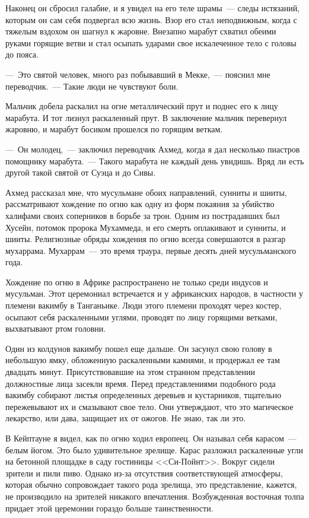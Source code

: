 \documentclass[12pt,a4paper,twoside,openany,svgnames]{memoir}
\begin{document}
Наконец он сбросил галабие, и я увидел на его теле шрамы~--- следы истязаний, которым он сам себя подвергал всю жизнь. Взор его стал неподвижным, когда с тяжелым вздохом он шагнул к жаровне. Внезапно марабут схватил обеими руками горящие ветви и стал осыпать ударами свое искалеченное тело с головы до пояса.

---~Это святой человек, много раз побывавший в Мекке,~--- пояснил мне переводчик.~--- Такие люди не чувствуют боли.

Мальчик добела раскалил на огне металлический прут и поднес его к лицу марабута. И тот лизнул раскаленный прут. В заключение мальчик перевернул жаровню, и марабут босиком прошелся по горящим веткам.

---~Он молодец,~--- заключил переводчик Ахмед, когда я дал несколько пиастров помощнику марабута.~--- Такого марабута не каждый день увидишь. Вряд ли есть другой такой святой от Суэца и до Сивы.

Ахмед рассказал мне, что мусульмане обоих направлений, сунниты и шииты, рассматривают хождение по огню как одну из форм покаяния за убийство халифами своих соперников в борьбе за трон. Одним из пострадавших был Хусейн, потомок пророка Мухаммеда, и его смерть оплакивают и сунниты, и шииты. Религиозные обряды хождения по огню всегда совершаются в разгар мухаррама. Мухаррам~--- это время траура, первые десять дней мусульманского года.

Хождение по огню в Африке распространено не только среди индусов и мусульман. Этот церемониал встречается и у африканских народов, в частности у племени вакимбу в Танганьике. Люди этого племени проходят через костер, осыпают себя раскаленными углями, проводят по лицу горящими ветками, выхватывают ртом головни.

Один из колдунов вакимбу пошел еще дальше. Он засунул свою голову в небольшую ямку, обложенную раскаленными камнями, и продержал ее там двадцать минут. Присутствовавшие на этом странном представлении должностные лица засекли время. Перед представлениями подобного рода вакимбу собирают листья определенных деревьев и кустарников, тщательно пережевывают их и смазывают свое тело. Они утверждают, что это магическое лекарство, или дава, защищает их от ожогов. Не знаю, так ли это.

В Кейптауне я видел, как по огню ходил европеец. Он называл себя карасом~--- белым йогом. Это было удивительное зрелище. Карас разложил раскаленные угли на бетонной площадке в саду гостиницы <<Си-Пойнт>>. Вокруг сидели зрители и пили пиво. Однако из-за отсутствия соответствующей атмосферы, которая обычно сопровождает такого рода зрелища, это представление, кажется, не производило на зрителей никакого впечатления. Возбужденная восточная толпа придает этой церемонии гораздо больше таинственности.
\end{document}
